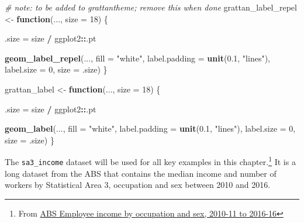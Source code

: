 \documentclass[]{book}
\newenvironment{Shaded}{\begin{snugshade}}{\end{snugshade}}
\newcommand{\CommentTok}[1]{\textcolor[rgb]{0.56,0.35,0.01}{\textit{#1}}}
\newcommand{\ControlFlowTok}[1]{\textcolor[rgb]{0.13,0.29,0.53}{\textbf{#1}}}
\newcommand{\DataTypeTok}[1]{\textcolor[rgb]{0.13,0.29,0.53}{#1}}
\newcommand{\DecValTok}[1]{\textcolor[rgb]{0.00,0.00,0.81}{#1}}
\newcommand{\FloatTok}[1]{\textcolor[rgb]{0.00,0.00,0.81}{#1}}
\newcommand{\KeywordTok}[1]{\textcolor[rgb]{0.13,0.29,0.53}{\textbf{#1}}}
\newcommand{\NormalTok}[1]{#1}
\newcommand{\OperatorTok}[1]{\textcolor[rgb]{0.81,0.36,0.00}{\textbf{#1}}}
\newcommand{\StringTok}[1]{\textcolor[rgb]{0.31,0.60,0.02}{#1}}
\let\rmarkdownfootnote\footnote%
\def\footnote{\protect\rmarkdownfootnote}
\begin{document}
\begin{Shaded}
\begin{Highlighting}[]
\CommentTok{# note: to be added to grattantheme; remove this when done}
\NormalTok{grattan_label_repel <-}\StringTok{ }\ControlFlowTok{function}\NormalTok{(..., }\DataTypeTok{size =} \DecValTok{18}\NormalTok{) \{}

\NormalTok{  .size =}\StringTok{ }\NormalTok{size }\OperatorTok{/}\StringTok{ }\NormalTok{ggplot2}\OperatorTok{::}\NormalTok{.pt}
  
  \KeywordTok{geom_label_repel}\NormalTok{(..., }
                   \DataTypeTok{fill =} \StringTok{"white"}\NormalTok{,}
                   \DataTypeTok{label.padding =} \KeywordTok{unit}\NormalTok{(}\FloatTok{0.1}\NormalTok{, }\StringTok{"lines"}\NormalTok{), }
                   \DataTypeTok{label.size =} \DecValTok{0}\NormalTok{,}
                   \DataTypeTok{size =}\NormalTok{ .size)}
\NormalTok{\}}


\NormalTok{grattan_label <-}\StringTok{ }\ControlFlowTok{function}\NormalTok{(..., }\DataTypeTok{size =} \DecValTok{18}\NormalTok{) \{}

\NormalTok{  .size =}\StringTok{ }\NormalTok{size }\OperatorTok{/}\StringTok{ }\NormalTok{ggplot2}\OperatorTok{::}\NormalTok{.pt}
  
  \KeywordTok{geom_label}\NormalTok{(..., }
                   \DataTypeTok{fill =} \StringTok{"white"}\NormalTok{,}
                   \DataTypeTok{label.padding =} \KeywordTok{unit}\NormalTok{(}\FloatTok{0.1}\NormalTok{, }\StringTok{"lines"}\NormalTok{), }
                   \DataTypeTok{label.size =} \DecValTok{0}\NormalTok{,}
                   \DataTypeTok{size =}\NormalTok{ .size)}
\NormalTok{\}}
\end{Highlighting}
\end{Shaded}

The \texttt{sa3\_income} dataset will be used for all key examples in this chapter.\footnote{From \href{https://www.abs.gov.au/AUSSTATS/abs@.nsf/DetailsPage/6524.0.55.0022011-2016?OpenDocument}{ABS Employee income by occupation and sex, 2010-11 to 2016-16}} It is a long dataset from the ABS that contains the median income and number of workers by Statistical Area 3, occupation and sex between 2010 and 2016.

\begin{Shaded}
\end{Shaded}
\end{document}
